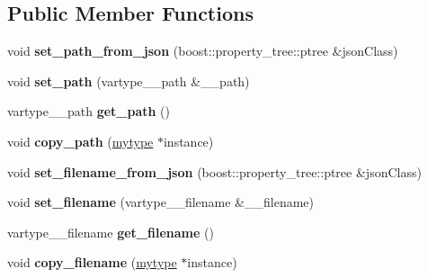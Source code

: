 \subsection*{Public Member Functions}
\begin{DoxyCompactItemize}
\item 
\mbox{\label{classfilter_1_1algos_1_1_save_image_af7c7cf12743e505f288828b6896d7fb2}} 
void {\bfseries set\+\_\+path\+\_\+from\+\_\+json} (boost\+::property\+\_\+tree\+::ptree \&json\+Class)
\item 
\mbox{\label{classfilter_1_1algos_1_1_save_image_a7dd89a55cca10cb54be70ff829280e27}} 
void {\bfseries set\+\_\+path} (vartype\+\_\+\+\_\+path \&\+\_\+\+\_\+path)
\item 
\mbox{\label{classfilter_1_1algos_1_1_save_image_af70e3d8c3675fa7313ccfd026527cfab}} 
vartype\+\_\+\+\_\+path {\bfseries get\+\_\+path} ()
\item 
\mbox{\label{classfilter_1_1algos_1_1_save_image_afff299574cd07a2855b5fc04a692c3ab}} 
void {\bfseries copy\+\_\+path} (\hyperlink{classfilter_1_1algos_1_1_save_image}{mytype} $\ast$instance)
\item 
\mbox{\label{classfilter_1_1algos_1_1_save_image_ab03f01b4739291fd95a6c1702472deb9}} 
void {\bfseries set\+\_\+filename\+\_\+from\+\_\+json} (boost\+::property\+\_\+tree\+::ptree \&json\+Class)
\item 
\mbox{\label{classfilter_1_1algos_1_1_save_image_af5f0cef940e7648ca5af114714972ee7}} 
void {\bfseries set\+\_\+filename} (vartype\+\_\+\+\_\+filename \&\+\_\+\+\_\+filename)
\item 
\mbox{\label{classfilter_1_1algos_1_1_save_image_a164ca1ba98a1d7a0e518f25c97b91064}} 
vartype\+\_\+\+\_\+filename {\bfseries get\+\_\+filename} ()
\item 
\mbox{\label{classfilter_1_1algos_1_1_save_image_ac27c120f3913c495364e6f19c1297b10}} 
void {\bfseries copy\+\_\+filename} (\hyperlink{classfilter_1_1algos_1_1_save_image}{mytype} $\ast$instance)

\end{DoxyCompactItemize}
